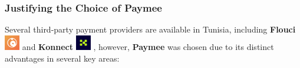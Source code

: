 \subsubsection{Justifying the Choice of Paymee}

Several third-party payment providers are available in Tunisia, including  \textbf{Flouci} \includegraphics[width=0.05\textwidth]{images/icons/flouci_icon.png} and  \textbf{Konnect} \includegraphics[width=0.05\textwidth]{images/icons/konnect_icon.png} , however, \textbf{Paymee} was chosen due to its distinct advantages in several key areas:

